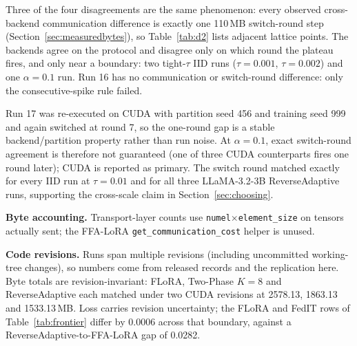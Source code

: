 Three of the four disagreements are the same phenomenon: every observed cross-backend communication difference is exactly one 110\,MB switch-round step (Section~\ref{sec:measuredbytes}), so Table~\ref{tab:d2} lists adjacent lattice points. The backends agree on the protocol and disagree only on which round the plateau fires, and only near a boundary: two tight-$\tau$ IID runs ($\tau{=}0.001$, $\tau{=}0.002$) and one $\alpha{=}0.1$ run. Run 16 has no communication or switch-round difference: only the consecutive-spike rule failed.

Run 17 was re-executed on CUDA with partition seed 456 and training seed 999 and again switched at round 7, so the one-round gap is a stable backend/partition property rather than run noise. At $\alpha{=}0.1$, exact switch-round agreement is therefore not guaranteed (one of three CUDA counterparts fires one round later); CUDA is reported as primary. The switch round matched exactly for every IID run at $\tau{=}0.01$ and for all three LLaMA-3.2-3B ReverseAdaptive runs, supporting the cross-scale claim in Section~\ref{sec:choosing}.

\textbf{Byte accounting.} Transport-layer counts use \texttt{numel}$\times$\texttt{element\_size} on tensors actually sent; the FFA-LoRA \texttt{get\_communication\_cost} helper is unused.

\textbf{Code revisions.} Runs span multiple revisions (including uncommitted working-tree changes), so numbers come from released records and the replication here. Byte totals are revision-invariant: FLoRA, Two-Phase $K{=}8$ and ReverseAdaptive each matched under two CUDA revisions at 2578.13, 1863.13 and 1533.13\,MB. Loss carries revision uncertainty; the FLoRA and FedIT rows of Table~\ref{tab:frontier} differ by 0.0006 across that boundary, against a ReverseAdaptive-to-FFA-LoRA gap of 0.0282.
